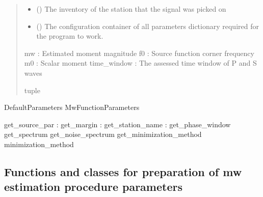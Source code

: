 \documentclass[letterpaper,10pt,english]{sphinxmanual}
\begin{document}
\begin{fulllineitems}
\begin{quote}
\begin{description}
\begin{itemize}
\item {} 
\sphinxAtStartPar
{} () \textendash{} The inventory of the station that the signal was picked on

\item {} 
\sphinxAtStartPar
{} () \textendash{} The configuration container of all parameters dictionary required for the program to work.

\end{itemize}

\sphinxAtStartPar
mw : Estimated moment magnitude
f0 : Source function corner frequency
m0 : Scalar moment
time\_window : The assessed time window of P and S waves

\sphinxAtStartPar
tuple

\end{description}\end{quote}
\begin{description}
\sphinxAtStartPar
DefaultParameters
MwFunctionParameters

\sphinxAtStartPar
get\_source\_par :
get\_margin :
get\_station\_name :
get\_phase\_window
get\_spectrum
get\_noise\_spectrum
get\_minimization\_method
minimization\_method

\end{description}

\end{fulllineitems}


\subsection{Functions and classes for preparation of mw estimation procedure parameters}
\label{\detokenize{api_support:functions-and-classes-for-preparation-of-mw-estimation-procedure-parameters}}\label{\detokenize{api_support:module-amw.mw.parameters}}
\end{document}
